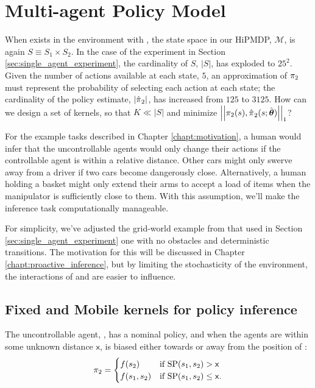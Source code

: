 \section{Multi-agent Policy Model}\label{sec:multi_agent_model}

    When  exists in the environment with , the state space in our \ac{HiPMDP}, $\mathcal{M}$, is again
    $S \equiv S_1 \times S_2$. In the case of the experiment in Section \ref{sec:single_agent_experiment}, the
    cardinality of $S$, $|S|$, has exploded to $25^2$. Given the number of actions available at each state, $5$, an
    approximation of $\pi_{2}$ must represent the probability of selecting each action at each state; the cardinality
    of the policy estimate, $|\hat{\pi_{}}_2|$, has increased from $125$ to $3125$. How can we design a set of
    kernels, so that $K \ll |S|$ and minimize $\left|\left|\pi_{2}(s), \hat{\pi_{}}_2(s;\hat{\boldsymbol{\mathbb{\theta}}})\right|\right|_1$?


    For the example tasks described in Chapter \ref{chapt:motivation}, a human would infer that the uncontrollable
    agents would only change their actions if the controllable agent is within a relative distance. Other cars might
    only swerve away from a driver if two cars become dangerously close. Alternatively, a human holding a basket might
    only extend their arms to accept a load of items when the manipulator is sufficiently close to them. With this
    assumption, we'll make the inference task computationally manageable.

    For simplicity, we've adjusted the grid-world example from that used in Section \ref{sec:single_agent_experiment}
    one with no obstacles and deterministic transitions. The motivation for this will be discussed in Chapter
    \ref{chapt:proactive_inference}, but by limiting the stochasticity of the environment, the interactions of 
    and  are easier to influence.

\subsection{Fixed and Mobile kernels for policy inference}\label{sec:fixed_and_mobile_kernels}

\begin{assumption}\label{assump:multi_agent_interraction}
        The uncontrollable agent, , has a nominal policy, and when the agents are within some unknown distance
        $\mathsf{x}$,  is biased either towards or away from the position of :
        \begin{align*}
        \pi_{2} & = \begin{cases}
        f(s_2) & \text{if}\ \textnormal{SP}(s_1,s_2) > \mathsf{x} \\
        f(s_1,s_2) & \text{if}\ \textnormal{SP}(s_1,s_2) \leq \mathsf{x}.
        \end{cases} \\
        \end{align*}
\end{assumption}


